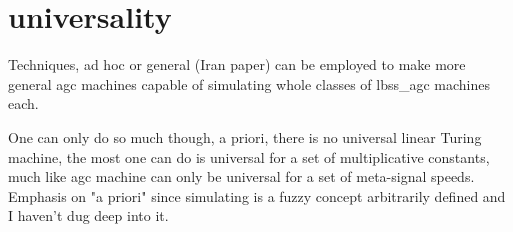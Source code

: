 \section {universality}
\label{sec:universality}
Techniques, ad hoc or general (Iran paper) can be employed to make more general agc machines capable of simulating whole classes of lbss\_agc machines each.

One can only do so much though, a priori, there is no universal linear Turing machine, the most one can do is universal for a set of multiplicative constants, much like agc machine can only be universal for a set of meta-signal speeds.
Emphasis on "a priori" since simulating is a fuzzy concept arbitrarily defined and I haven't dug deep into it.